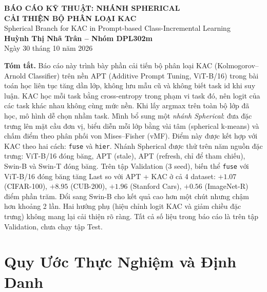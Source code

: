 \documentclass[10pt,a4paper]{article}
\begin{document}
\begin{center}
{\LARGE\bfseries BÁO CÁO KỸ THUẬT: NHÁNH SPHERICAL\\[2pt] CẢI THIỆN BỘ PHÂN LOẠI KAC}\\[6pt]
{\large Spherical Branch for KAC in Prompt-based Class-Incremental Learning}\\[10pt]
{\bfseries Huỳnh Thị Nhã Trân -- Nhóm DPL302m}\\[4pt]
Ngày 30 tháng 10 năm 2026
\end{center}

\vspace{4pt}
\textbf{Tóm tắt.} Báo cáo này trình bày phần cải tiến bộ phân loại KAC (Kolmogorov--Arnold Classifier) trên nền APT (Additive Prompt Tuning, ViT-B/16) trong bài toán học liên tục tăng dần lớp, không lưu mẫu cũ và không biết task id khi suy luận. KAC học mỗi task bằng cross-entropy trong phạm vi task đó, nên logit của các task khác nhau không cùng mức nền. Khi lấy argmax trên toàn bộ lớp đã học, mô hình dễ chọn nhầm task. Mình bổ sung một \emph{nhánh Spherical}: đưa đặc trưng lên mặt cầu đơn vị, biểu diễn mỗi lớp bằng vài tâm (spherical k-means) và chấm điểm theo phân phối von Mises--Fisher (vMF). Điểm này được kết hợp với KAC theo hai cách: \texttt{fuse} và \texttt{hier}. Nhánh Spherical được thử trên năm nguồn đặc trưng: ViT-B/16 đóng băng, APT (stale), APT (refresh, chỉ để tham chiếu), Swin-B và Swin-T đóng băng. Trên tập Validation (3 seed), biến thể \texttt{fuse} với ViT-B/16 đóng băng tăng Last so với APT + KAC ở cả 4 dataset: $+1.07$ (CIFAR-100), $+8.95$ (CUB-200), $+1.96$ (Stanford Cars), $+0.56$ (ImageNet-R) điểm phần trăm. Đổi sang Swin-B cho kết quả cao hơn một chút nhưng chậm hơn khoảng 2 lần. Hai hướng phụ (hiệu chỉnh logit KAC và giảm chiều đặc trưng) không mang lại cải thiện rõ ràng. Tất cả số liệu trong báo cáo là trên tập Validation, chưa chạy tập Test.

\section{Quy Ước Thực Nghiệm và Định Danh}
\end{document}
